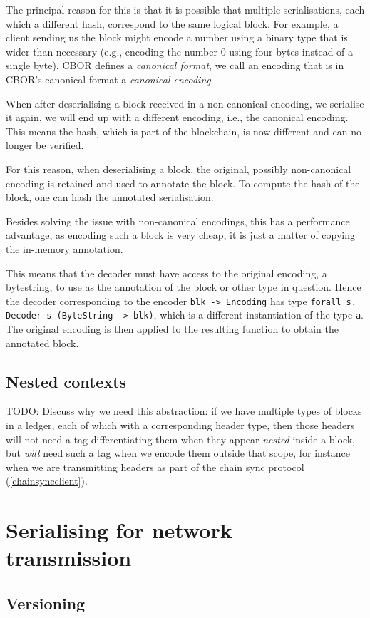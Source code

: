The principal reason for this is that it is possible that multiple
serialisations, each which a different hash, correspond to the same logical
block. For example, a client sending us the block might encode a number using a
binary type that is wider than necessary (e.g., encoding the number 0 using four
bytes instead of a single byte). CBOR defines a \emph{canonical format}, we call
an encoding that is in CBOR's canonical format a \emph{canonical encoding}.

When after deserialising a block received in a non-canonical encoding, we
serialise it again, we will end up with a different encoding, i.e., the
canonical encoding. This means the hash, which is part of the blockchain, is now
different and can no longer be verified.

For this reason, when deserialising a block, the original, possibly
non-canonical encoding is retained and used to annotate the block. To compute
the hash of the block, one can hash the annotated serialisation.

Besides solving the issue with non-canonical encodings, this has a performance
advantage, as encoding such a block is very cheap, it is just a matter of
copying the in-memory annotation.


This means that the decoder must have access to the original encoding, a
bytestring, to use as the annotation of the block or other type in question.
Hence the decoder corresponding to the encoder \lstinline!blk -> Encoding! has
type \lstinline!forall s. Decoder s (ByteString -> blk)!, which is a different
instantiation of the type \lstinline!a!. The original encoding is then applied
to the resulting function to obtain the annotated block.

\subsection{Nested contexts}
\label{serialisation:disk:nested-contexts}


TODO: Discuss why we need this abstraction: if we have multiple types of blocks
in a ledger, each of which with a corresponding header type, then those headers
will not need a tag differentiating them when they appear \emph{nested} inside
a block, but \emph{will} need such a tag when we encode them outside that scope,
for instance when we are transmitting headers as part of the chain sync
protocol (\cref{chainsyncclient}).



\section{Serialising for network transmission}
\label{serialisation:network}


\subsection{Versioning}
\label{serialisation:network:versioning}
